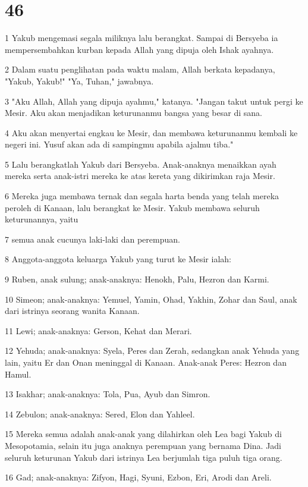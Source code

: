\chapter{46}

\par 1 Yakub mengemasi segala miliknya lalu berangkat. Sampai di Bersyeba ia mempersembahkan kurban kepada Allah yang dipuja oleh Ishak ayahnya.
\par 2 Dalam suatu penglihatan pada waktu malam, Allah berkata kepadanya, "Yakub, Yakub!" "Ya, Tuhan," jawabnya.
\par 3 "Aku Allah, Allah yang dipuja ayahmu," katanya. "Jangan takut untuk pergi ke Mesir. Aku akan menjadikan keturunanmu bangsa yang besar di sana.
\par 4 Aku akan menyertai engkau ke Mesir, dan membawa keturunanmu kembali ke negeri ini. Yusuf akan ada di sampingmu apabila ajalmu tiba."
\par 5 Lalu berangkatlah Yakub dari Bersyeba. Anak-anaknya menaikkan ayah mereka serta anak-istri mereka ke atas kereta yang dikirimkan raja Mesir.
\par 6 Mereka juga membawa ternak dan segala harta benda yang telah mereka peroleh di Kanaan, lalu berangkat ke Mesir. Yakub membawa seluruh keturunannya, yaitu
\par 7 semua anak cucunya laki-laki dan perempuan.
\par 8 Anggota-anggota keluarga Yakub yang turut ke Mesir ialah:
\par 9 Ruben, anak sulung; anak-anaknya: Henokh, Palu, Hezron dan Karmi.
\par 10 Simeon; anak-anaknya: Yemuel, Yamin, Ohad, Yakhin, Zohar dan Saul, anak dari istrinya seorang wanita Kanaan.
\par 11 Lewi; anak-anaknya: Gerson, Kehat dan Merari.
\par 12 Yehuda; anak-anaknya: Syela, Peres dan Zerah, sedangkan anak Yehuda yang lain, yaitu Er dan Onan meninggal di Kanaan. Anak-anak Peres: Hezron dan Hamul.
\par 13 Isakhar; anak-anaknya: Tola, Pua, Ayub dan Simron.
\par 14 Zebulon; anak-anaknya: Sered, Elon dan Yahleel.
\par 15 Mereka semua adalah anak-anak yang dilahirkan oleh Lea bagi Yakub di Mesopotamia, selain itu juga anaknya perempuan yang bernama Dina. Jadi seluruh keturunan Yakub dari istrinya Lea berjumlah tiga puluh tiga orang.
\par 16 Gad; anak-anaknya: Zifyon, Hagi, Syuni, Ezbon, Eri, Arodi dan Areli.
